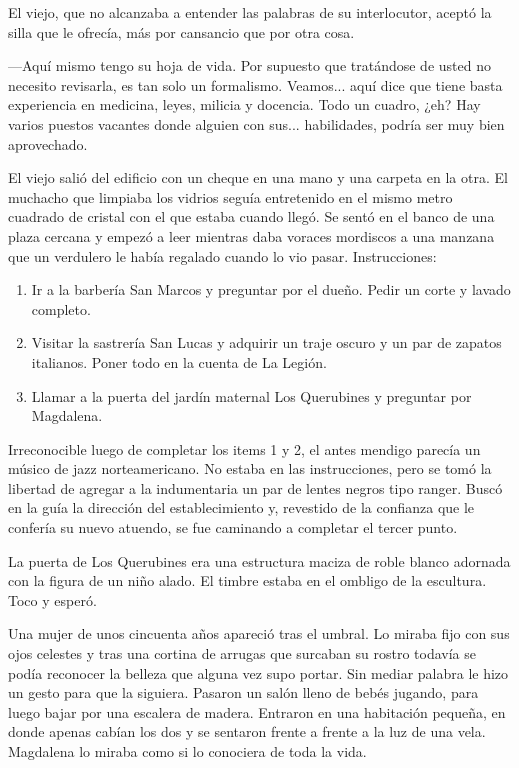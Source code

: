 \documentclass[11pt,twoside,openright,a5paper]{book}
\begin{document}
El viejo, que no alcanzaba a entender las palabras de su interlocutor, aceptó la silla que le ofrecía, más por cansancio que por otra cosa.

---Aquí mismo tengo su hoja de vida. Por supuesto que tratándose de usted no necesito revisarla, es tan solo un formalismo. Veamos... aquí dice que tiene basta experiencia en medicina, leyes, milicia y docencia. Todo un cuadro, ¿eh? Hay varios puestos vacantes donde alguien con sus... habilidades, podría ser muy bien aprovechado.


El viejo salió del edificio con un cheque en una mano y una carpeta en la otra. El muchacho que limpiaba los vidrios seguía entretenido en el mismo metro cuadrado de cristal con el que estaba cuando llegó. Se sentó en el banco de una plaza cercana y empezó a leer mientras daba voraces mordiscos a una manzana que un verdulero le había regalado cuando lo vio pasar. Instrucciones:

\begin{enumerate}
\item{Ir a la barbería San Marcos y preguntar por el dueño. Pedir un corte y lavado completo.}
\item{Visitar la sastrería San Lucas y adquirir un traje oscuro y un par de zapatos italianos. Poner todo en la cuenta de La Legión.}
\item{Llamar a la puerta del jardín maternal Los Querubines y preguntar por Magdalena.}
\end{enumerate}

Irreconocible luego de completar los items 1 y 2, el antes mendigo parecía un músico de jazz norteamericano. No estaba en las instrucciones, pero se tomó la libertad de agregar a la indumentaria un par de lentes negros tipo ranger. Buscó en la guía la dirección del establecimiento y, revestido de la confianza que le confería su nuevo atuendo, se fue caminando a completar el tercer punto.

La puerta de Los Querubines era una estructura maciza de roble blanco adornada con la figura de un niño alado. El timbre estaba en el ombligo de la escultura. Toco y esperó.

Una mujer de unos cincuenta años apareció tras el umbral. Lo miraba fijo con sus ojos celestes y tras una cortina de arrugas que surcaban su rostro todavía se podía reconocer la belleza que alguna vez supo portar. Sin mediar palabra le hizo un gesto para que la siguiera. Pasaron un salón lleno de bebés jugando, para luego bajar por una escalera de madera. Entraron en una habitación pequeña, en donde apenas cabían los dos y se sentaron frente a frente a la luz de una vela. Magdalena lo miraba como si lo conociera de toda la vida.
\end{document}
